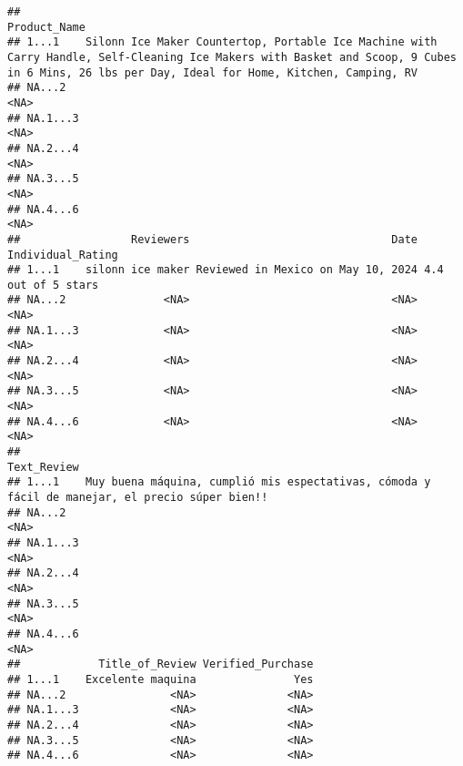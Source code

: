 \documentclass[
  11pt,
]{article}
\begin{document}
\begin{verbatim}
##                                                                                                                                                                                          Product_Name
## 1...1    Silonn Ice Maker Countertop, Portable Ice Machine with Carry Handle, Self-Cleaning Ice Makers with Basket and Scoop, 9 Cubes in 6 Mins, 26 lbs per Day, Ideal for Home, Kitchen, Camping, RV
## NA...2                                                                                                                                                                                           <NA>
## NA.1...3                                                                                                                                                                                         <NA>
## NA.2...4                                                                                                                                                                                         <NA>
## NA.3...5                                                                                                                                                                                         <NA>
## NA.4...6                                                                                                                                                                                         <NA>
##                 Reviewers                               Date  Individual_Rating
## 1...1    silonn ice maker Reviewed in Mexico on May 10, 2024 4.4 out of 5 stars
## NA...2               <NA>                               <NA>               <NA>
## NA.1...3             <NA>                               <NA>               <NA>
## NA.2...4             <NA>                               <NA>               <NA>
## NA.3...5             <NA>                               <NA>               <NA>
## NA.4...6             <NA>                               <NA>               <NA>
##                                                                                             Text_Review
## 1...1    Muy buena máquina, cumplió mis espectativas, cómoda y fácil de manejar, el precio súper bien!!
## NA...2                                                                                             <NA>
## NA.1...3                                                                                           <NA>
## NA.2...4                                                                                           <NA>
## NA.3...5                                                                                           <NA>
## NA.4...6                                                                                           <NA>
##            Title_of_Review Verified_Purchase
## 1...1    Excelente maquina               Yes
## NA...2                <NA>              <NA>
## NA.1...3              <NA>              <NA>
## NA.2...4              <NA>              <NA>
## NA.3...5              <NA>              <NA>
## NA.4...6              <NA>              <NA>
\end{verbatim}
\end{document}
